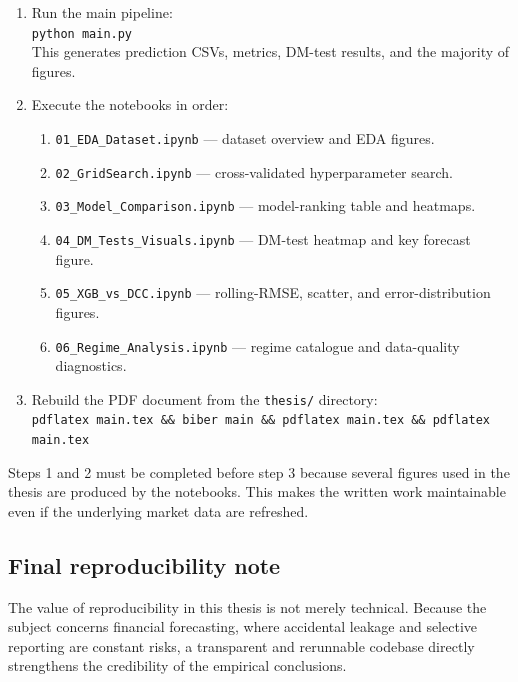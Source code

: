 \begin{enumerate}
    \item Run the main pipeline:\\
          \texttt{python main.py}\\
          This generates prediction CSVs, metrics, DM-test results, and the majority of figures.
    \item Execute the notebooks in order:
    \begin{enumerate}
        \item \texttt{01\_EDA\_Dataset.ipynb} --- dataset overview and EDA figures.
        \item \texttt{02\_GridSearch.ipynb} --- cross-validated hyperparameter search.
        \item \texttt{03\_Model\_Comparison.ipynb} --- model-ranking table and heatmaps.
        \item \texttt{04\_DM\_Tests\_Visuals.ipynb} --- DM-test heatmap and key forecast figure.
        \item \texttt{05\_XGB\_vs\_DCC.ipynb} --- rolling-RMSE, scatter, and error-distribution figures.
        \item \texttt{06\_Regime\_Analysis.ipynb} --- regime catalogue and data-quality diagnostics.
    \end{enumerate}
    \item Rebuild the PDF document from the \texttt{thesis/} directory:\\
          \texttt{pdflatex main.tex \&\& biber main \&\& pdflatex main.tex \&\& pdflatex main.tex}
\end{enumerate}

Steps 1 and 2 must be completed before step 3 because several figures used in the thesis are produced by the notebooks. This makes the written work maintainable even if the underlying market data are refreshed.

\subsection{Final reproducibility note}

The value of reproducibility in this thesis is not merely technical. Because the subject concerns financial forecasting, where accidental leakage and selective reporting are constant risks, a transparent and rerunnable codebase directly strengthens the credibility of the empirical conclusions.
